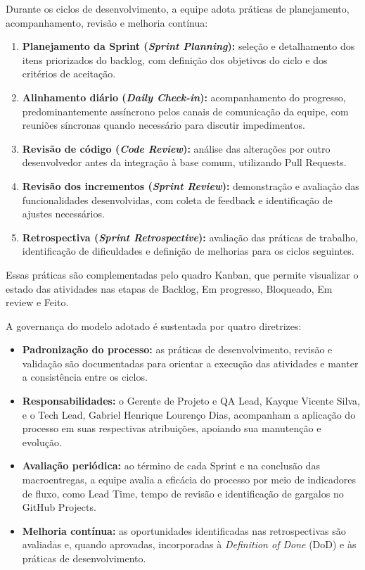 
Durante os ciclos de desenvolvimento, a equipe adota práticas de planejamento, acompanhamento, revisão e melhoria contínua:

\begin{enumerate}
\item \textbf{Planejamento da Sprint (\emph{Sprint Planning}):} seleção e detalhamento dos itens priorizados do backlog, com definição dos objetivos do ciclo e dos critérios de aceitação.
\item \textbf{Alinhamento diário (\emph{Daily Check-in}):} acompanhamento do progresso, predominantemente assíncrono pelos canais de comunicação da equipe, com reuniões síncronas quando necessário para discutir impedimentos.
\item \textbf{Revisão de código (\emph{Code Review}):} análise das alterações por outro desenvolvedor antes da integração à base comum, utilizando Pull Requests.
\item \textbf{Revisão dos incrementos (\emph{Sprint Review}):} demonstração e avaliação das funcionalidades desenvolvidas, com coleta de feedback e identificação de ajustes necessários.
\item \textbf{Retrospectiva (\emph{Sprint Retrospective}):} avaliação das práticas de trabalho, identificação de dificuldades e definição de melhorias para os ciclos seguintes.
\end{enumerate}

Essas práticas são complementadas pelo quadro Kanban, que permite visualizar o estado das atividades nas etapas de Backlog, Em progresso, Bloqueado, Em review e Feito.


A governança do modelo adotado é sustentada por quatro diretrizes:

\begin{itemize}
\item \textbf{Padronização do processo:} as práticas de desenvolvimento, revisão e validação são documentadas para orientar a execução das atividades e manter a consistência entre os ciclos.
\item \textbf{Responsabilidades:} o Gerente de Projeto e QA Lead, Kayque Vicente Silva, e o Tech Lead, Gabriel Henrique Lourenço Dias, acompanham a aplicação do processo em suas respectivas atribuições, apoiando sua manutenção e evolução.
\item \textbf{Avaliação periódica:} ao término de cada Sprint e na conclusão das macroentregas, a equipe avalia a eficácia do processo por meio de indicadores de fluxo, como Lead Time, tempo de revisão e identificação de gargalos no GitHub Projects.
\item \textbf{Melhoria contínua:} as oportunidades identificadas nas retrospectivas são avaliadas e, quando aprovadas, incorporadas à \emph{Definition of Done} (DoD) e às práticas de desenvolvimento.
\end{itemize}

